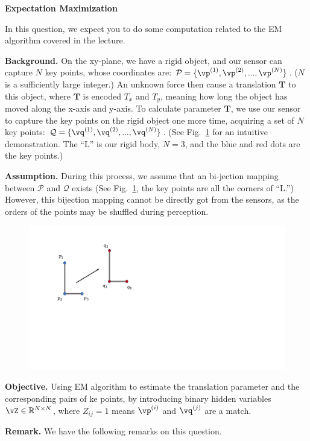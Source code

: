
\begin{Q}
\textbf{\Large Expectation Maximization}

In this question, we expect you to do some computation related to the EM algorithm covered in the lecture.

\textbf{Background.} On the xy-plane, we have a rigid object, and our sensor can capture $N$ key points, whose coordinates are: $\mathcal{P}=\{\vp^{(1)}, \vp^{(2)}, ..., \vp^{(N)}\}$. ($N$ is a sufficiently large integer.) An unknown force then cause a translation $\mathbf{T}$ to this object, where $\mathbf{T}$ is encoded $T_x$ and $T_y$, meaning how long the object has moved along the x-axis and y-axis. To calculate parameter $\mathbf{T}$, we use our sensor to capture the key points on the rigid object one more time, acquiring a set of $N$ key points: $\mathcal{Q}=\{\vq^{(1)}, \vq^{(2)}, ..., \vq^{(N)}\}$. (See Fig.~\ref{fig:em} for an intuitive demonstration. The ``L'' is our rigid body, $N=3$, and the blue and red dots are the key points.)

\textbf{Assumption.} During this process, we assume that an bi-jection mapping between $\mathcal{P}$ and $\mathcal{Q}$ exists (See Fig.~\ref{fig:em}, the key points are all the corners of ``L.'') However, this bijection mapping cannot be directly got from the sensors, as the orders of the points may be shuffled during perception. 

\begin{figure}[h]
    \centering
    \includegraphics[width=0.6\columnwidth]{figs/em.pdf}
    \caption{}
    \label{fig:em}
\end{figure}

\textbf{Objective.} Using EM algorithm to estimate the translation parameter and the corresponding pairs of ke points, by introducing binary hidden variables $\vZ \in \mathbb{R}^{N\times N}$, where $Z_{ij}=1$ means  $\vp^{(i)}$ and $\vq^{(j)}$ are a match.

\textbf{Remark.} We have the following remarks on this question.


\end{Q}

